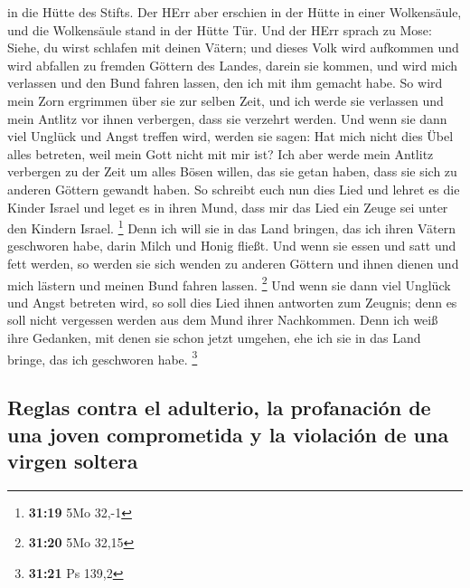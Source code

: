 in die Hütte des Stifts.  Der HErr aber erschien in der
Hütte in einer Wolkensäule, und die Wolkensäule stand in der Hütte Tür.
 Und der HErr sprach zu Mose: Siehe, du wirst schlafen
mit deinen Vätern; und dieses Volk wird aufkommen und wird abfallen zu
fremden Göttern des Landes, darein sie kommen, und wird mich verlassen
und den Bund fahren lassen, den ich mit ihm gemacht habe.
 So wird mein Zorn ergrimmen über sie zur selben Zeit,
und ich werde sie verlassen und mein Antlitz vor ihnen verbergen, dass
sie verzehrt werden. Und wenn sie dann viel Unglück und Angst treffen
wird, werden sie sagen: Hat mich nicht dies Übel alles betreten, weil
mein Gott nicht mit mir ist?  Ich aber werde mein Antlitz
verbergen zu der Zeit um alles Bösen willen, das sie getan haben, dass
sie sich zu anderen Göttern gewandt haben.  So schreibt
euch nun dies Lied und lehret es die Kinder Israel und leget es in ihren
Mund, dass mir das Lied ein Zeuge sei unter den Kindern Israel.
\footnote{\textbf{31:19} 5Mo 32,-1}  Denn ich will sie in
das Land bringen, das ich ihren Vätern geschworen habe, darin Milch und
Honig fließt. Und wenn sie essen und satt und fett werden, so werden sie
sich wenden zu anderen Göttern und ihnen dienen und mich lästern und
meinen Bund fahren lassen. \footnote{\textbf{31:20} 5Mo 32,15}
 Und wenn sie dann viel Unglück und Angst betreten wird,
so soll dies Lied ihnen antworten zum Zeugnis; denn es soll nicht
vergessen werden aus dem Mund ihrer Nachkommen. Denn ich weiß ihre
Gedanken, mit denen sie schon jetzt umgehen, ehe ich sie in das Land
bringe, das ich geschworen habe. \footnote{\textbf{31:21} Ps 139,2}

\hypertarget{reglas-contra-el-adulterio-la-profanaciuxf3n-de-una-joven-comprometida-y-la-violaciuxf3n-de-una-virgen-soltera}{%
\subsection{Reglas contra el adulterio, la profanación de una joven
comprometida y la violación de una virgen
soltera}\label{reglas-contra-el-adulterio-la-profanaciuxf3n-de-una-joven-comprometida-y-la-violaciuxf3n-de-una-virgen-soltera}}

